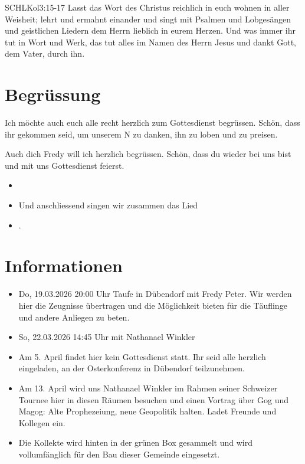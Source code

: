 \documentclass[14pt]{../../inc/mybib}
\newcommand{\Name}{Fredy}
\begin{document}
\begin{bibelbox}{SCHL}{Kol}{3:15-17}
    Lasst das Wort des Christus reichlich in euch wohnen in aller Weisheit; lehrt und ermahnt einander und singt mit Psalmen und Lobgesängen und geistlichen Liedern dem Herrn lieblich in eurem Herzen. Und was immer ihr tut in Wort und Werk, das tut alles im Namen des Herrn Jesus und dankt Gott, dem Vater, durch ihn.
\end{bibelbox}
\section{Begrüssung}
Ich möchte auch euch alle recht herzlich zum Gottesdienst begrüssen. Schön, dass ihr gekommen seid, um unserem \herr N zu danken, ihn zu loben und zu preisen.

Auch dich \Name{} will ich herzlich begrüssen. Schön, dass du wieder bei uns bist und mit uns Gottesdienst feierst.
\begin{itemize}
    \item[] 
    \item[] Und anschliessend singen wir zusammen das Lied
    \item[] .
\end{itemize}

\section{Informationen}
\begin{itemize}
    \item {} Do, 19.03.2026 20:00 Uhr Taufe in Dübendorf mit Fredy Peter. Wir werden hier die Zeugnisse übertragen und die Möglichkeit bieten für die Täuflinge und andere Anliegen zu beten.
    \item {} So, 22.03.2026 14:45 Uhr mit Nathanael Winkler
    \item {} Am 5. April findet hier kein Gottesdienst statt. Ihr seid alle herzlich eingeladen, an der Osterkonferenz in Dübendorf teilzunehmen.
    \item {} Am 13. April wird uns Nathanael Winkler im Rahmen seiner Schweizer Tournee hier in diesen Räumen besuchen und einen Vortrag über Gog und Magog: Alte Prophezeiung, neue Geopolitik halten. Ladet Freunde und Kollegen ein.
    \item {} Die Kollekte wird hinten in der grünen Box gesammelt und wird vollumfänglich für den Bau dieser Gemeinde eingesetzt.
\end{itemize}
\end{document}
